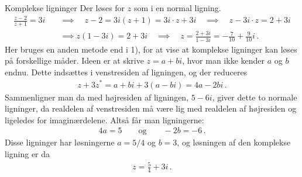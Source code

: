 \begin{opgave}[2]{Komplekse ligninger}
\opg Der løses for $z$ som i en normal ligning.
\begin{align*}
\frac{z-2}{z+1} = 3i \quad &\implies \quad z-2 = 3i\left(z+1\right) = 3i \cdot z + 3i \quad \implies \quad z - 3i \cdot z = 2 + 3i \\
&\implies z  \left(1-3i\right) = 2+3i \quad \implies \quad z = \frac{2+3i}{1-3i} = -\frac{7}{10} +  \frac{9}{10}i \, .
\end{align*}
\opg Her bruges en anden metode end i 1), for at vise at komplekse ligninger kan løses på forskellige måder. Ideen er at skrive $z=a+bi$, hvor man ikke kender $a$ og $b$ endnu. Dette indsættes i venstresiden af ligningen, og der reduceres
\begin{align*}
z + 3z^* = a+bi + 3(a-bi) = 4a -2bi \, .
\end{align*}
Sammenligner man da med højresiden af ligningen, $5-6i$, giver dette to normale ligninger, da realdelen af venstresiden må være lig med realdelen af højresiden og ligeledes for imaginærdelene. Altså får man ligningerne:
\begin{align*}
4a = 5 \qquad \text{og} \qquad -2b = -6 \, .
\end{align*}
Disse ligninger har løsningerne $a=5/4$ og $b=3$, og løsningen af den komplekse ligning er da
\begin{align*}
z = \frac{5}{4} + 3i \, .
\end{align*}
\end{opgave}
